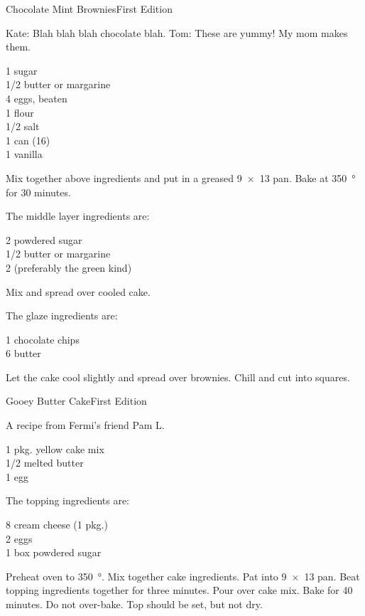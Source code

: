 \begin{entry}{Chocolate Mint Brownies}{First Edition}

\begin{open}
  Kate: Blah blah blah chocolate blah. Tom: These are yummy!  My mom makes
  them.
\end{open}
\begin{ingredients}
  \SI{1}{\cup} sugar\\
  \SI{1/2}{\cup} butter or margarine\\
  4 eggs, beaten\\
  \SI{1}{\cup} flour\\
  \SI{1/2}{\teaspoon} salt\\
  1 can  (\SI{16}{\ounce})\\
  \SI{1}{\teaspoon} vanilla
\end{ingredients}
Mix together above ingredients and put in a greased \SI{9x13}{\inch} pan.
Bake at \SI{350}{\degree} for 30 minutes.

The middle layer ingredients are:
\begin{ingredients}
  \SI{2}{\cup} powdered sugar\\
  \SI{1/2}{\cup} butter or margarine\\
  \SI{2}{\tblspoon}  (preferably the green kind)
\end{ingredients}
Mix and spread over cooled cake.

The glaze ingredients are:
\begin{ingredients}
  \SI{1}{\cup} chocolate chips\\
  \SI{6}{\tblspoon} butter
\end{ingredients}
Let the cake cool slightly and spread over brownies.  Chill and cut into
squares.
\end{entry}

\begin{entry}{Gooey Butter Cake}{First Edition}

\begin{open}
  A recipe from Fermi's friend Pam L.
\end{open}
\begin{ingredients}
  1 pkg. yellow cake mix\\
  \SI{1/2}{\cup} melted butter\\
  1 egg
\end{ingredients}
The topping ingredients are:
\begin{ingredients}
  \SI{8}{\ounce} cream cheese (1 pkg.)\\
  2 eggs\\
  1 box powdered sugar
\end{ingredients}
Preheat oven to \SI{350}{\degree}.  Mix together cake ingredients.  Pat into
\SI{9x13}{\inch} pan.  Beat topping ingredients together for three minutes.
Pour over cake mix.  Bake for 40 minutes.  Do not over-bake. Top should be
set, but not dry.
\end{entry}

